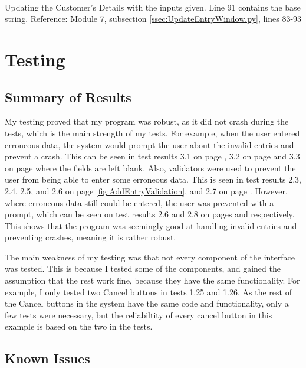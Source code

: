 \

Updating the Customer's Details with the inputs given. Line 91 contains the base string.
Reference: Module 7,  subsection \ref{ssec:UpdateEntryWindow.py}, lines 83-93


\section{Testing}

\subsection{Summary of Results}

My testing proved that my program was robust, as it did not crash during the tests, which is the main strength of my tests. For example, when the user entered erroneous data, the system would prompt the user about the invalid entries and prevent a crash. This can be seen in test results 3.1 on page \pageref{fig:AddBookValidation}, 3.2 on page \pageref{fig:AddInvoiceItemTest} and 3.3 on page \pageref{fig:AddRoyaltyItemTest} where the fields are left blank. Also, validators were used to prevent the user from being able to enter some erroneous data. This is seen in test results 2.3, 2.4, 2.5, and 2.6 on page \ref{fig:AddEntryValidation}, and 2.7 on page \pageref{fig:ISBNRejection}. However, where erroneous data still could be entered, the user was prevented with a prompt, which can be seen on test results 2.6 and 2.8 on pages \pageref{fig:InvalidAddress} and \pageref{fig:PagesRejection} respectively. This shows that the program was seemingly good at handling invalid entries and preventing crashes, meaning it is rather robust.

The main weakness of my testing was that not every component of the interface was tested. This is because I tested some of the components, and gained the assumption that the rest work fine, because they have the same functionality. For example, I only tested two Cancel buttons in tests 1.25 and 1.26. As the rest of the Cancel buttons in the system have the same code and functionality, only a few tests were necessary, but the reliabiltity of every cancel button in this example is based on the two in the tests.

\subsection{Known Issues}

